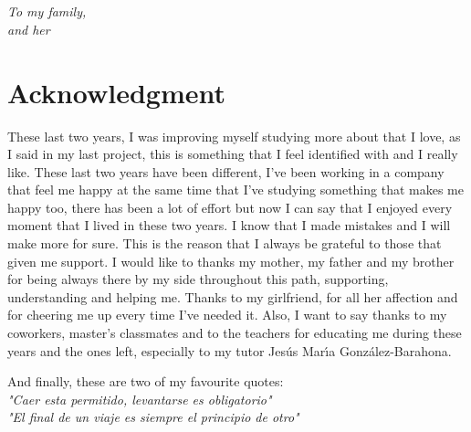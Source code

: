 \documentclass[a4paper, 12pt]{book}
\begin{document}
\newpage
\mbox{}
\thispagestyle{empty} %



\chapter*{}
\begin{flushright}
\textit{To my family, \\
and her
}
\end{flushright}


\chapter*{Acknowledgment}

These last two years, I was improving myself studying more about that I love, as I said in my last project, this is something that I feel identified with and I really like. These last two years have been different, I've been working in a company that feel me happy at the same time that I've studying something that makes me happy too, there has been a lot of effort but now I can say that I enjoyed every moment that I lived in these two years. I know that I made mistakes and I will make more for sure. This is the reason that I always be grateful to those that given me support. I would like to thanks my mother, my father and my brother for being always there by my side throughout this path, supporting, understanding and helping me. Thanks to my girlfriend, for all her affection and for cheering me up every time I've needed it. Also, I want to say thanks to my coworkers, master's classmates and to the teachers for educating me during these years and the ones left, especially to my tutor Jesús Marı́a González-Barahona.

And finally, these are two of my favourite quotes:\\ 

\textit{"Caer esta permitido, levantarse es obligatorio"}\\
\textit{"El final de un viaje es siempre el principio de otro"}
\end{document}
